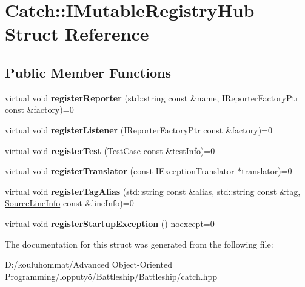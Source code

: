 \hypertarget{struct_catch_1_1_i_mutable_registry_hub}{}\section{Catch\+:\+:I\+Mutable\+Registry\+Hub Struct Reference}
\label{struct_catch_1_1_i_mutable_registry_hub}
\subsection*{Public Member Functions}
\begin{DoxyCompactItemize}
\item 
\mbox{\label{struct_catch_1_1_i_mutable_registry_hub_a1c0ac202ac31ee9f88e8ff5cbac4b243}} 
virtual void {\bfseries register\+Reporter} (std\+::string const \&name, I\+Reporter\+Factory\+Ptr const \&factory)=0
\item 
\mbox{\label{struct_catch_1_1_i_mutable_registry_hub_abd892a133f85581fd00ee75bb379ca56}} 
virtual void {\bfseries register\+Listener} (I\+Reporter\+Factory\+Ptr const \&factory)=0
\item 
\mbox{\label{struct_catch_1_1_i_mutable_registry_hub_a11b85c6744d88c9f83fe16ad4a8dd451}} 
virtual void {\bfseries register\+Test} (\mbox{\hyperlink{class_catch_1_1_test_case}{Test\+Case}} const \&test\+Info)=0
\item 
\mbox{\label{struct_catch_1_1_i_mutable_registry_hub_ae6825365102693cf7707db022a2c2b49}} 
virtual void {\bfseries register\+Translator} (const \mbox{\hyperlink{struct_catch_1_1_i_exception_translator}{I\+Exception\+Translator}} $\ast$translator)=0
\item 
\mbox{\label{struct_catch_1_1_i_mutable_registry_hub_abf2e386b6f94f615719ada711adbf822}} 
virtual void {\bfseries register\+Tag\+Alias} (std\+::string const \&alias, std\+::string const \&tag, \mbox{\hyperlink{struct_catch_1_1_source_line_info}{Source\+Line\+Info}} const \&line\+Info)=0
\item 
\mbox{\label{struct_catch_1_1_i_mutable_registry_hub_a72a7d5386851ac3200f8da794a009c86}} 
virtual void {\bfseries register\+Startup\+Exception} () noexcept=0
\end{DoxyCompactItemize}


The documentation for this struct was generated from the following file\+:\begin{DoxyCompactItemize}
\item 
D\+:/kouluhommat/\+Advanced Object-\/\+Oriented Programming/lopputyö/\+Battleship/\+Battleship/catch.\+hpp\end{DoxyCompactItemize}
